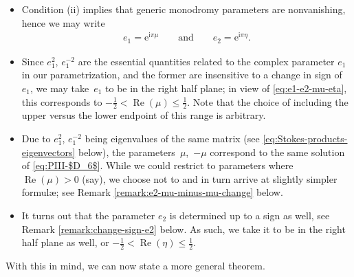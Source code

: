 \documentclass[pdftex]{sigma}
\numberwithin{equation}{section}
\newcommand{\ee}{\mathrm{e}}
\newcommand{\ii}{\mathrm{i}}
\newcommand{\re}{\operatorname{Re}}
\begin{document}
\begin{itemize}\itemsep=0pt
 \item Condition (ii) implies that generic monodromy parameters are nonvanishing, hence we may write
 \begin{gather}
 e_1=\ee^{\ii\pi\mu}\qquad \text{and}\qquad e_2=\ee^{\ii\pi\eta}. \label{eq:e1-e2-mu-eta}
 \end{gather}
 \item Since $e_1^2$, $e_1^{-2}$ are the essential quantities related to the complex parameter $e_1$ in our parametrization, and the former are insensitive to a change in sign of $e_1$, we may take~$e_1$ to be in the right half plane; in view of \eqref{eq:e1-e2-mu-eta}, this corresponds to $-\frac12 < \re(\mu) \leq \frac12$. Note that the choice of including the upper versus the lower endpoint of this range is arbitrary.
 \item Due to $e_1^2$, $e_1^{-2}$ being eigenvalues of the same matrix (see \eqref{eq:Stokes-products-eigenvectors} below), the parameters~$\mu$,~$-\mu$ correspond to the same solution of \eqref{eq:PIII-$D_6$}. While we could restrict to parameters where $\re(\mu) >0$ (say), we choose not to and in turn arrive at slightly simpler formul\ae; see Remark \ref{remark:e2-mu-minus-mu-change} below.
 \item It turns out that the parameter $e_2$ is determined up to a sign as well, see Remark \ref{remark:change-sign-e2} below. As such, we take it to be in the right half plane as well, or $-\frac12 < \re(\eta) \leq \frac12$.
\end{itemize}
With this in mind, we can now state a more general theorem.
\end{document}
